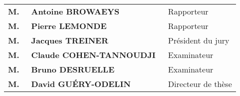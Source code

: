 \begin{center}
\begin{minipage}{14cm}
\large\centering
\begin{tabular}{lp{8cm}l}

\bf M.&	\ \bf  Antoine BROWAEYS\ \rm\dotfill			&%
Rapporteur%
\vspace{.1cm}\\
\bf M.&	\ \bf  Pierre LEMONDE\ \rm\dotfill			&%
Rapporteur%
\vspace{.1cm}\\
\bf M.&	\ \bf  Jacques TREINER\ \rm\dotfill	&%
Président du jury%
\vspace{.1cm}\\
\bf M.&	\ \bf  Claude COHEN-TANNOUDJI\ \rm\dotfill			&%
Examinateur%
\vspace{.1cm}\\
\bf M.&	\ \bf  Bruno DESRUELLE\ \rm\dotfill			&%
Examinateur%
\vspace{.1cm}\\
\bf M.&	\ \bf David GUÉRY-ODELIN\ \rm\dotfill		&%
Directeur de thèse%
%


\end{tabular}
\end{minipage}
\end{center}




